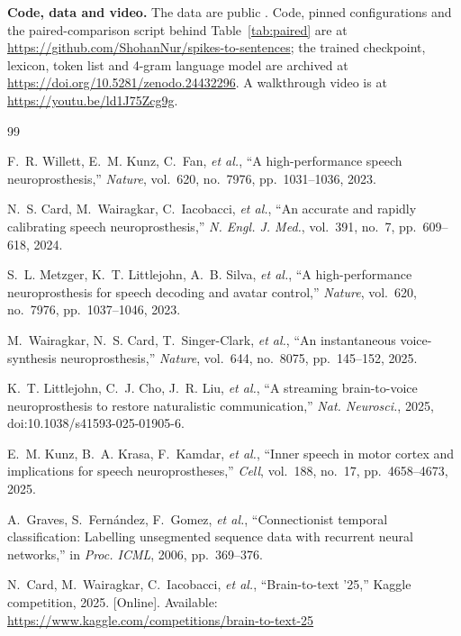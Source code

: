 \documentclass[conference,a4paper,10pt]{IEEEtran}
\newcommand{\ZenodoLink}{\url{https://doi.org/10.5281/zenodo.24432296}}
\newcommand{\GitHubLink}{\url{https://github.com/ShohanNur/spikes-to-sentences}}
\newcommand{\VideoLink}{\url{https://youtu.be/ld1J75Zcg9g}}
\begin{document}
\textbf{Code, data and video.} The data are public \cite{kaggle2025b2t}. Code,
pinned configurations and the paired-comparison script behind
Table~\ref{tab:paired} are at \GitHubLink{}; the trained checkpoint, lexicon,
token list and 4-gram language model are archived at \ZenodoLink{}. A
walkthrough video is at \VideoLink{}.

\balance
\begin{thebibliography}{99}
\scriptsize
\setlength{\itemsep}{0pt}
\setlength{\parsep}{0pt}
\setlength{\parskip}{0pt}

F.~R. Willett, E.~M. Kunz, C.~Fan, \textit{et al.}, ``A high-performance speech neuroprosthesis,'' \textit{Nature}, vol.~620, no.~7976, pp.~1031--1036, 2023.

N.~S. Card, M.~Wairagkar, C.~Iacobacci, \textit{et al.}, ``An accurate and rapidly calibrating speech neuroprosthesis,'' \textit{N. Engl. J. Med.}, vol.~391, no.~7, pp.~609--618, 2024.

S.~L. Metzger, K.~T. Littlejohn, A.~B. Silva, \textit{et al.}, ``A high-performance neuroprosthesis for speech decoding and avatar control,'' \textit{Nature}, vol.~620, no.~7976, pp.~1037--1046, 2023.

M.~Wairagkar, N.~S. Card, T.~Singer-Clark, \textit{et al.}, ``An instantaneous voice-synthesis neuroprosthesis,'' \textit{Nature}, vol.~644, no.~8075, pp.~145--152, 2025.

K.~T. Littlejohn, C.~J. Cho, J.~R. Liu, \textit{et al.}, ``A streaming brain-to-voice neuroprosthesis to restore naturalistic communication,'' \textit{Nat. Neurosci.}, 2025, doi:10.1038/s41593-025-01905-6.

E.~M. Kunz, B.~A. Krasa, F.~Kamdar, \textit{et al.}, ``Inner speech in motor cortex and implications for speech neuroprostheses,'' \textit{Cell}, vol.~188, no.~17, pp.~4658--4673, 2025.

A.~Graves, S.~Fern\'{a}ndez, F.~Gomez, \textit{et al.}, ``Connectionist temporal classification: Labelling unsegmented sequence data with recurrent neural networks,'' in \textit{Proc. ICML}, 2006, pp.~369--376.

N.~Card, M.~Wairagkar, C.~Iacobacci, \textit{et al.}, ``Brain-to-text '25,'' Kaggle competition, 2025. [Online]. Available: \url{https://www.kaggle.com/competitions/brain-to-text-25}


\end{thebibliography}
\end{document}
